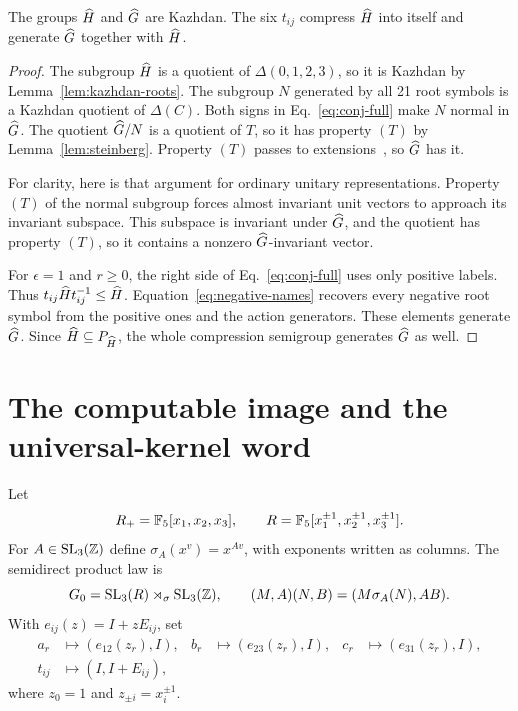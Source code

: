 \begin{proposition}\label{prop:kazhdan-pair}
The groups $\widehat H$ and $\widehat G$ are Kazhdan. The six $t_{ij}$ compress $\widehat H$ into
itself and generate $\widehat G$ together with $\widehat H$.
\end{proposition}
\begin{proof}
The subgroup $\widehat H$ is a quotient of $\Delta(0,1,2,3)$, so it is Kazhdan by
Lemma~\ref{lem:kazhdan-roots}. The subgroup $N$ generated by all 21 root symbols is a
Kazhdan quotient of $\Delta(C)$. Both signs in Eq.~\eqref{eq:conj-full} make $N$
normal in $\widehat G$. The quotient $\widehat G/N$ is a quotient of $T$, so it has property
$(T)$ by Lemma~\ref{lem:steinberg}. Property $(T)$ passes to
extensions~\cite[Proposition~1.7.6]{bhv}, so $\widehat G$ has it.

For clarity, here is that argument for ordinary unitary representations. Property
$(T)$ of the normal subgroup forces almost invariant unit vectors to approach its invariant
subspace. This subspace is invariant under $\widehat G$, and the quotient has property $(T)$,
so it contains a nonzero $\widehat G$-invariant vector.

For $\epsilon=1$ and $r\ge0$, the right side of Eq.~\eqref{eq:conj-full} uses only
positive labels. Thus $t_{ij}\widehat H t_{ij}^{-1}\le\widehat H$. Equation~\eqref{eq:negative-names}
recovers every negative root symbol from the positive ones and the action generators.
These elements generate $\widehat G$. Since $\widehat H\subseteq P_{\widehat H}$, the whole compression
semigroup generates $\widehat G$ as well.
\end{proof}

\section{The computable image and the universal-kernel word}\label{sec:image}

Let
\begin{equation}
 R_+=\mathbb F_5[x_1,x_2,x_3],\qquad R=\mathbb F_5[x_1^{\pm1},x_2^{\pm1},x_3^{\pm1}].
\end{equation}
For $A\in\operatorname{SL}_3(\mathbb Z)$ define $\sigma_A(x^v)=x^{Av}$, with exponents written as columns.
The semidirect product law is
\begin{equation}
 G_0=\operatorname{SL}_3(R)\rtimes_\sigma\operatorname{SL}_3(\mathbb Z),\qquad
 (M,A)(N,B)=(M\sigma_A(N),AB).
 \label{eq:semidirect}
\end{equation}
With $e_{ij}(z)=I+zE_{ij}$, set
\begin{align}
 a_r&\longmapsto(e_{12}(z_r),I),&
 b_r&\longmapsto(e_{23}(z_r),I),&
 c_r&\longmapsto(e_{31}(z_r),I),\label{eq:root-images}\\
 t_{ij}&\longmapsto(I,I+E_{ij}),&&&\label{eq:t-images}
\end{align}
where $z_0=1$ and $z_{\pm i}=x_i^{\pm1}$.

